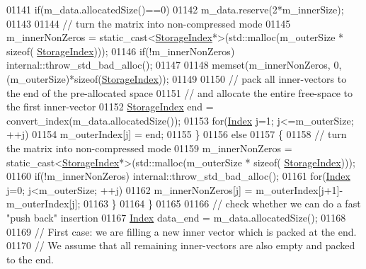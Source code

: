 \begin{DoxyCode}
01141       \textcolor{keywordflow}{if}(m\_data.allocatedSize()==0)
01142         m\_data.reserve(2*m\_innerSize);
01143       
01144       \textcolor{comment}{// turn the matrix into non-compressed mode}
01145       m\_innerNonZeros = \textcolor{keyword}{static\_cast<}\hyperlink{group___sparse_core___module_a0b540ba724726ebe953f8c0df06081ed}{StorageIndex}*\textcolor{keyword}{>}(std::malloc(m\_outerSize * \textcolor{keyword}{sizeof}(
      \hyperlink{group___sparse_core___module_a0b540ba724726ebe953f8c0df06081ed}{StorageIndex})));
01146       \textcolor{keywordflow}{if}(!m\_innerNonZeros) internal::throw\_std\_bad\_alloc();
01147       
01148       memset(m\_innerNonZeros, 0, (m\_outerSize)*\textcolor{keyword}{sizeof}(\hyperlink{group___sparse_core___module_a0b540ba724726ebe953f8c0df06081ed}{StorageIndex}));
01149       
01150       \textcolor{comment}{// pack all inner-vectors to the end of the pre-allocated space}
01151       \textcolor{comment}{// and allocate the entire free-space to the first inner-vector}
01152       \hyperlink{group___sparse_core___module_a0b540ba724726ebe953f8c0df06081ed}{StorageIndex} end = convert\_index(m\_data.allocatedSize());
01153       \textcolor{keywordflow}{for}(\hyperlink{group___core___module_a554f30542cc2316add4b1ea0a492ff02}{Index} j=1; j<=m\_outerSize; ++j)
01154         m\_outerIndex[j] = end;
01155     \}
01156     \textcolor{keywordflow}{else}
01157     \{
01158       \textcolor{comment}{// turn the matrix into non-compressed mode}
01159       m\_innerNonZeros = \textcolor{keyword}{static\_cast<}\hyperlink{group___sparse_core___module_a0b540ba724726ebe953f8c0df06081ed}{StorageIndex}*\textcolor{keyword}{>}(std::malloc(m\_outerSize * \textcolor{keyword}{sizeof}(
      \hyperlink{group___sparse_core___module_a0b540ba724726ebe953f8c0df06081ed}{StorageIndex})));
01160       \textcolor{keywordflow}{if}(!m\_innerNonZeros) internal::throw\_std\_bad\_alloc();
01161       \textcolor{keywordflow}{for}(\hyperlink{group___core___module_a554f30542cc2316add4b1ea0a492ff02}{Index} j=0; j<m\_outerSize; ++j)
01162         m\_innerNonZeros[j] = m\_outerIndex[j+1]-m\_outerIndex[j];
01163     \}
01164   \}
01165   
01166   \textcolor{comment}{// check whether we can do a fast "push back" insertion}
01167   \hyperlink{group___core___module_a554f30542cc2316add4b1ea0a492ff02}{Index} data\_end = m\_data.allocatedSize();
01168   
01169   \textcolor{comment}{// First case: we are filling a new inner vector which is packed at the end.}
01170   \textcolor{comment}{// We assume that all remaining inner-vectors are also empty and packed to the end.}

\end{DoxyCode}
